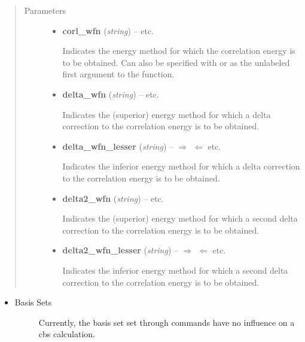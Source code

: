 \documentclass[letterpaper,10pt,english]{sphinxmanual}
\begin{document}
\begin{fulllineitems}
\begin{description}
\end{description}
\begin{quote}\begin{description}
\item[{Parameters}] \leavevmode\begin{itemize}
\item {} 
\textbf{corl\_wfn} (\emph{string}) -- 
 \textbar{}\textbar{}  \textbar{}\textbar{} etc.

Indicates the energy method for which the correlation energy is to be
obtained. Can also be specified with  or as the unlabeled
first argument to the function.


\item {} 
\textbf{delta\_wfn} (\emph{string}) -- 
 \textbar{}\textbar{}  \textbar{}\textbar{} etc.

Indicates the (superior) energy method for which a delta correction 
to the correlation energy is to be obtained.


\item {} 
\textbf{delta\_wfn\_lesser} (\emph{string}) -- 
$\Rightarrow$  $\Leftarrow$ \textbar{}\textbar{}  \textbar{}\textbar{} etc.

Indicates the inferior energy method for which a delta correction 
to the correlation energy is to be obtained.


\item {} 
\textbf{delta2\_wfn} (\emph{string}) -- 
 \textbar{}\textbar{}  \textbar{}\textbar{} etc.

Indicates the (superior) energy method for which a second delta correction 
to the correlation energy is to be obtained.


\item {} 
\textbf{delta2\_wfn\_lesser} (\emph{string}) -- 
$\Rightarrow$  $\Leftarrow$ \textbar{}\textbar{}  \textbar{}\textbar{} etc.

Indicates the inferior energy method for which a second delta correction 
to the correlation energy is to be obtained.


\end{itemize}

\end{description}\end{quote}
\begin{itemize}
\item {} \begin{description}
\item[{Basis Sets}] \leavevmode
Currently, the basis set set through  commands have no influence
on a cbs calculation.


\end{description}
\end{itemize}
\end{fulllineitems}
\end{document}
